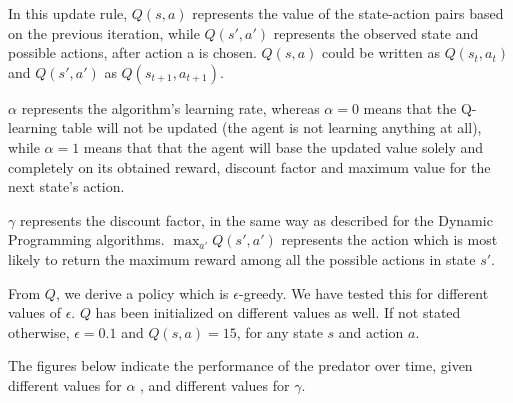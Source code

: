 \documentclass[a4paper,11pt]{article}
\begin{document}
In this update rule, $Q(s,a)$ represents the value of the state-action pairs based on the previous iteration, while $Q(s',a')$ represents the observed state and possible actions, after action a is chosen. $Q(s,a)$ could be written as $Q(s_t,a_t)$ and $Q(s',a')$ as $Q(s_{t+1}, a_{t+1})$.

$\alpha$ represents the algorithm's learning rate, whereas $\alpha =0$ means that the Q-learning table will not be updated (the agent is not learning anything at all), while $\alpha =1$ means that that the agent will base the updated value solely and completely on its obtained reward, discount factor and maximum value for the next state's action.

$\gamma$ represents the discount factor, in the same way as described for the Dynamic Programming algorithms.  $\max_{a'} Q(s', a')$ represents the action which is most likely to return the maximum reward among all the possible actions in state $s'$.

From $Q$, we derive a policy which is $\epsilon$-greedy.  We have tested this for different values of $\epsilon$.  $Q$ has been initialized on different values as well.  If not stated otherwise, $\epsilon = 0.1$ and $Q(s, a) = 15$, for any state $s$ and action $a$.

The figures below indicate the performance of the predator over time, given different values for $\alpha$ , and different values for $\gamma$.
\end{document}
